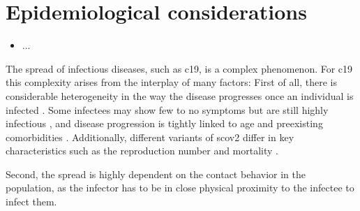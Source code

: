 \glsresetall
\chapter{Epidemiological considerations}
\label{chap:epidemiological_considerations}
\begin{tcolorbox}[title={Contributions of this chapter}]
    \begin{itemize}
        \item ...
    \end{itemize}
\end{tcolorbox}
\newpage

The spread of infectious diseases, such as \acrshort{c19}, is a complex phenomenon. For \acrshort{c19} this complexity arises from the interplay of many factors: First of all, there is considerable heterogeneity in the way the disease progresses once an individual is infected \cite{Salzberger2021Epidemiology} . Some infectees may show few to no symptoms but are still highly infectious \cite{Byambasuren2020Estimating}, and disease progression is tightly linked to age and preexisting comorbidities \cite{Biswas2020Association}. Additionally, different variants of \acrshort{scov2} differ in key characteristics such as the reproduction number \cite{Du2022Reproduction} and mortality \cite{Hughes2023Effect}. 

Second, the spread is highly dependent on the contact behavior in the population, as the infector has to be in close physical proximity to the infectee to infect them. 



